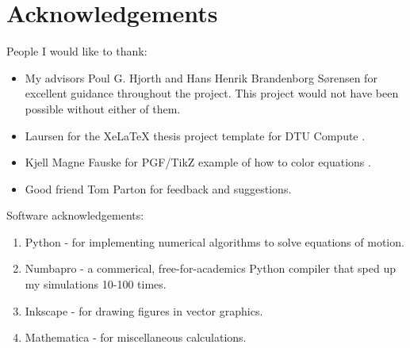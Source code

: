 \chapter{Acknowledgements}
People I would like to thank:
\begin{itemize}
    \item My advisors Poul G. Hjorth and Hans Henrik Brandenborg Sørensen for excellent guidance throughout the project. This project would not have been possible without either of them.
    \item Laursen for the XeLaTeX thesis project template for DTU Compute \cite{laursen}.
    \item Kjell Magne Fauske for PGF/TikZ example of how to color equations \cite{fauske}.
    \item Good friend Tom Parton for feedback and suggestions.
\end{itemize}
Software acknowledgements:
\begin{enumerate}
    \item Python - for implementing numerical algorithms to solve equations of motion. 
    \item Numbapro - a commerical, free-for-academics Python compiler that sped up my simulations 10-100 times.
    \item Inkscape - for drawing figures in vector graphics.
    \item Mathematica - for miscellaneous calculations.


\end{enumerate}